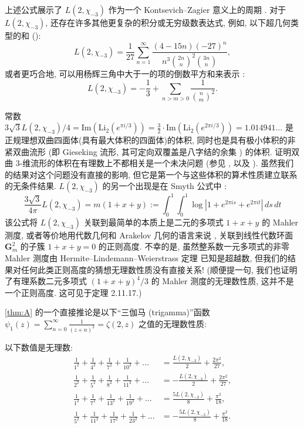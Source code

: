 上述公式展示了 $L(2, \chi_{-3})$ 作为一个 Kontsevich--Zagier 意义上的周期 \cite{KZ01}.
对于 $L(2, \chi_{-3})$, 还存在许多其他更复杂的积分或无穷级数表达式,
例如, 以下超几何类型的和 (\cite[§3]{HPHP11}):
\[ L(2,\chi_{-3}) = \frac{1}{27} \sum_{n=1}^{\infty} \frac{(4-15n)(-27)^n}{n^3 \binom{2n}{n}^2 \binom{3n}{n}}, \]
或者更巧合地, 可以用杨辉三角中大于一的项的倒数平方和来表示 \cite{Sta23}:
\[ L(2,\chi_{-3}) = -\frac{1}{3} + \sum_{n>m>0} \frac{1}{\binom{n}{m}^2}. \]

常数 $3\sqrt{3} L(2,\chi_{-3})/4 = \mathrm{Im}(\mathrm{Li}_2(e^{\pi i/3})) = \frac{3}{2} \cdot \mathrm{Im}(\mathrm{Li}_2(e^{2\pi i/3})) = 1.014941\dots$ 
是正规理想双曲四面体(具有最大体积的四面体)的体积,
同时也是具有极小体积的非紧双曲流形 \cite{Ada87} (即 Gieseking 流形, 其可定向双覆盖是八字结的余集 \cite{Thu97}) 的体积.
证明双曲 $3$-维流形的体积在有理数上不都相关是一个未决问题 (参见 \cite[Problem 23]{Thu82}, 以及 \cite{Mil82}\cite{Mil83}).
虽然我们的结果对这个问题没有直接的影响, 但它是第一个与这些体积的算术性质建立联系的无条件结果.
$L(2, \chi_{-3})$ 的另一个出现是在 Smyth 公式中 \cite[Prop. 3.4]{BZ20}:
\begin{equation}\label{eq:1.1.2}
\frac{3\sqrt{3}}{4\pi}L(2,\chi_{-3}) = m(1+x+y) := \int_0^1 \int_0^1 \log|1 + e^{2\pi i s} + e^{2\pi i t}| \, ds \, dt
\end{equation}
该公式将 $L(2, \chi_{-3})$ 关联到最简单的本质上是二元的多项式 $1+x+y$ 的 Mahler 测度,
或者等价地用代数几何和 Arakelov 几何的语言来说 \cite{Phi91}\cite{BGS94}, 
关联到线性代数环面 $\mathbf{G}_m^2$ 的子簇 $1+x+y=0$ 的正则高度.
不幸的是, 虽然整系数一元多项式的非零 Mahler 测度由 Hermite--Lindemann--Weierstrass 定理 \cite{Her1874}\cite{Lin1882}\cite{Wei1885} 已知是超越数, 
但我们的结果对任何此类正则高度的猜想无理数性质没有直接关系!
(顺便提一句, 我们也证明了有理系数二元多项式 $(1+x+y)^4/3$ 的 Mahler 测度的无理数性质, 这并不是一个正则高度. 这可见于定理 2.11.17.)

\autoref{thm:A} 的一个直接推论是以下``三伽马 (trigamma)''函数 $\psi_1(z) = \sum_{n=0}^{\infty} \frac{1}{(z+n)^2} = \zeta(2,z)$ 之值的无理数性质:

\begin{maincorollary}\label{cor:B}
以下数值是无理数:
\begin{align*}
\frac{1}{1^2} + \frac{1}{4^2} + \frac{1}{7^2} + \frac{1}{10^2} + \dots &= \frac{L(2, \chi_{-3})}{2} + \frac{2\pi^2}{27}, \\
\frac{1}{2^2} + \frac{1}{5^2} + \frac{1}{8^2} + \frac{1}{11^2} + \dots &= -\frac{L(2, \chi_{-3})}{2} + \frac{2\pi^2}{27}, \\
\frac{1}{1^2} + \frac{1}{7^2} + \frac{1}{13^2} + \frac{1}{19^2} + \dots &= \frac{5L(2, \chi_{-3})}{8} + \frac{\pi^2}{18}, \\
\frac{1}{5^2} + \frac{1}{11^2} + \frac{1}{17^2} + \frac{1}{23^2} + \dots &= -\frac{5L(2, \chi_{-3})}{8} + \frac{\pi^2}{18}.
\end{align*}
\end{maincorollary}

